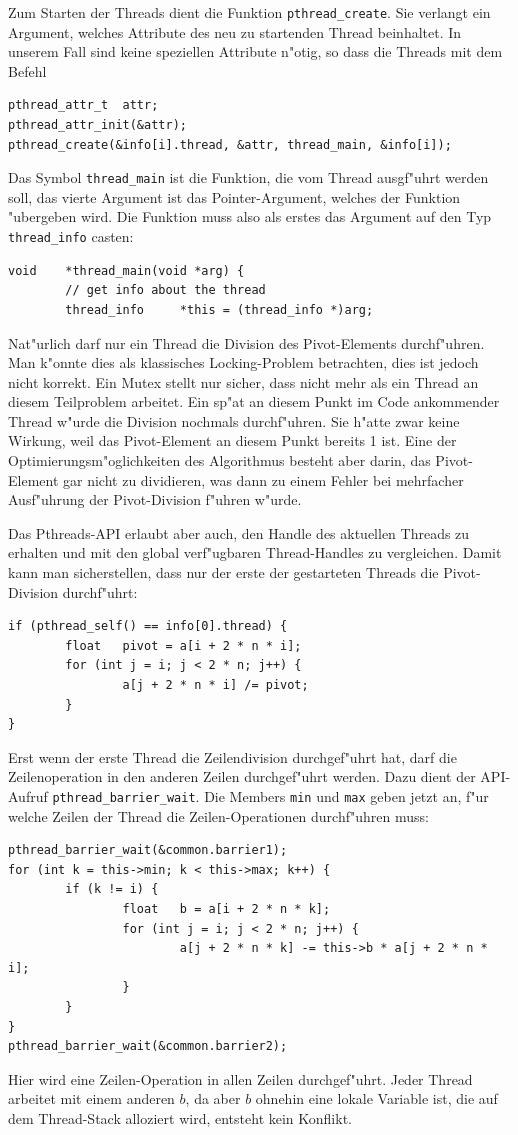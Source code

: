 Zum Starten der Threads dient die Funktion \verb+pthread_create+.
Sie verlangt ein Argument, welches Attribute des neu zu startenden
Thread beinhaltet. In unserem Fall sind keine speziellen Attribute
n"otig, so dass die Threads mit dem Befehl
\begin{verbatim}
pthread_attr_t  attr;
pthread_attr_init(&attr);
pthread_create(&info[i].thread, &attr, thread_main, &info[i]);
\end{verbatim}
Das Symbol \verb+thread_main+ ist die Funktion, die vom Thread
ausgf"uhrt werden soll, das vierte Argument ist das Pointer-Argument,
welches der Funktion "ubergeben wird.
Die Funktion muss also als erstes das Argument auf den Typ \verb+thread_info+
casten:
\begin{verbatim}
void    *thread_main(void *arg) {
        // get info about the thread
        thread_info     *this = (thread_info *)arg;
\end{verbatim}
Nat"urlich darf nur ein Thread die Division des Pivot-Elements durchf"uhren.
Man k"onnte dies als klassisches Locking-Problem betrachten, dies ist
jedoch nicht korrekt. Ein Mutex stellt nur sicher, dass nicht mehr als
ein Thread an diesem Teilproblem arbeitet. Ein sp"at an diesem Punkt
im Code ankommender Thread w"urde die Division nochmals durchf"uhren.
Sie h"atte zwar keine Wirkung, weil das Pivot-Element an diesem Punkt
bereits 1 ist. Eine der Optimierungsm"oglichkeiten des Algorithmus
besteht aber darin, das Pivot-Element gar nicht zu dividieren, was
dann zu einem Fehler bei mehrfacher Ausf"uhrung der Pivot-Division
f"uhren w"urde.

Das Pthreads-API erlaubt aber auch, den Handle des aktuellen Threads
zu erhalten und mit den global verf"ugbaren Thread-Handles zu
vergleichen. Damit kann man sicherstellen, dass nur der erste der
gestarteten Threads die Pivot-Division durchf"uhrt:
\begin{verbatim}
if (pthread_self() == info[0].thread) {
        float   pivot = a[i + 2 * n * i];
        for (int j = i; j < 2 * n; j++) {
                a[j + 2 * n * i] /= pivot;
        }
}
\end{verbatim}

Erst wenn der erste Thread die Zeilendivision durchgef"uhrt hat, darf 
die Zeilenoperation in den anderen Zeilen durchgef"uhrt werden. Dazu
dient der API-Aufruf \verb+pthread_barrier_wait+.
Die Members {\tt min} und {\tt max} geben jetzt an, f"ur welche Zeilen
der Thread die Zeilen-Operationen durchf"uhren muss:
\begin{verbatim}
pthread_barrier_wait(&common.barrier1);
for (int k = this->min; k < this->max; k++) {
        if (k != i) {
                float   b = a[i + 2 * n * k];
                for (int j = i; j < 2 * n; j++) {
                        a[j + 2 * n * k] -= this->b * a[j + 2 * n * i];
                }
        }
}
pthread_barrier_wait(&common.barrier2);
\end{verbatim}
Hier wird eine Zeilen-Operation in allen Zeilen durchgef"uhrt.
Jeder Thread arbeitet mit einem anderen $b$, da aber $b$ ohnehin
eine lokale Variable ist, die auf dem Thread-Stack alloziert wird,
entsteht kein Konflikt.

